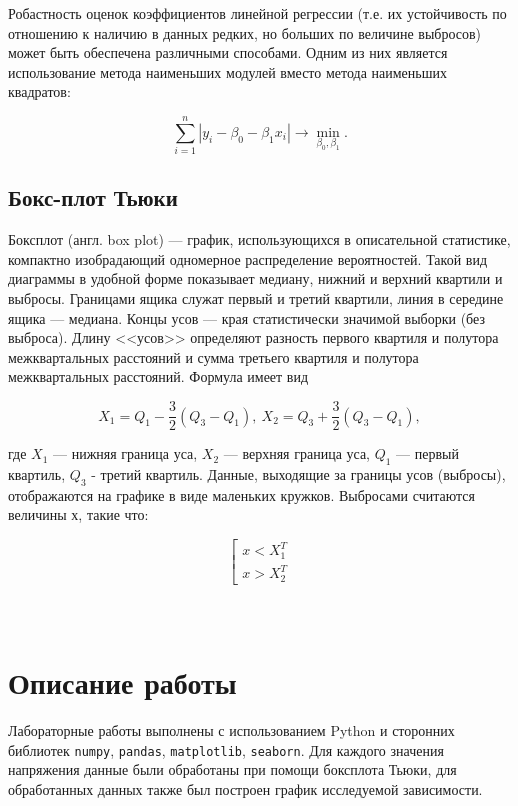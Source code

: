 \documentclass[12pt]{article}
\begin{document}
Робастность оценок коэффициентов линейной регрессии (т.е. их
устойчивость по отношению к наличию в данных редких, но больших по
величине выбросов) может быть обеспечена различными способами. Одним из
них является использование метода наименьших модулей вместо метода
наименьших квадратов:

\begin{equation} \label{eq:lam}
    \sum \limits_{i=1}^n |y_i - \beta_0 - \beta_1 x_i| \rightarrow
    \min_{\beta_0, \beta_1}.
\end{equation}


\subsection{Бокс-плот Тьюки}
Боксплот (англ. box plot) — график, использующихся в описательной статистике, компактно изобрадающий одномерное распределение вероятностей. Такой вид диаграммы в удобной форме показывает медиану, нижний и верхний квартили и выбросы. Границами ящика служат первый и третий квартили, линия в середине ящика — медиана. Концы усов — края статистически значимой выборки (без выброса). Длину <<усов>> определяют разность первого квартиля и полутора межквартальных расстояний и сумма третьего квартиля и полутора межквартальных расстояний. Формула имеет вид

\begin{equation} \label{eq:box_plot}
X_1 = Q_1 - \frac{3}{2}(Q_3 - Q_1), \ X_2 = Q_3 + \frac{3}{2}(Q_3 - Q_1),
\end{equation}

где $X_1$ — нижняя граница уса, $X_2$ — верхняя граница уса, $Q_1$ — первый квартиль, $Q_3$ - третий квартиль.
Данные, выходящие за границы усов (выбросы), отображаются на графике в виде маленьких кружков.
Выбросами считаются величины $х$, такие что:

\begin{equation} \label{eq:outlier}
\left[
  \begin{array}{ll}
      x < X_1^T \\
      x > X_2^T
  \end{array}
\right .
\end{equation}\\\\
\section{Описание работы}
Лабораторные работы выполнены с использованием Python и сторонних
библиотек \verb!numpy!, \verb!pandas!, \verb!matplotlib!, \verb!seaborn!. Для каждого значения напряжения данные были обработаны при помощи боксплота Тьюки, для обработанных данных также был построен график исследуемой зависимости.
\end{document}
